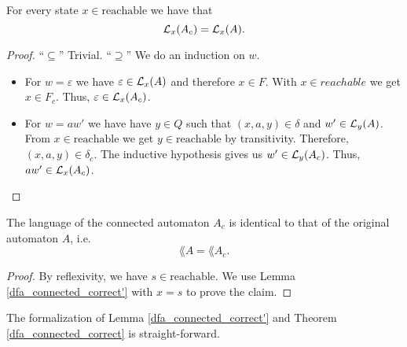 \begin{lemma}
    \label{dfa_connected_correct'}
    For every state $x \in \mathrm{reachable}$ we have that
    \begin{equation*}
        \mathcal{L}_{x}(A_c) = \mathcal{L}_{x}(A).
    \end{equation*}
\end{lemma}
\begin{proof}
    ``$\subseteq$'' Trivial.
    ``$\supseteq$''
    We do an induction on $w$.
    \begin{itemize}
        \item
            For $w = \varepsilon$ we have $\varepsilon \in \mathcal{L}_{x}(A)$ and therefore $x \in F$. 
            With $x \in reachable$ we get $x \in F_c$. 
            Thus, $\varepsilon \in \mathcal{L}_{x}(A_c)$.
        \item
            For $w = a w'$ we have have $y \in Q$ such that $(x, a, y) \in \delta$ and $w' \in \mathcal{L}_{y}(A)$.
            From $x \in \mathrm{reachable}$ we get $y \in \mathrm{reachable}$ by transitivity.
            Therefore, $(x,a,y) \in \delta_c$.
            The inductive hypothesis gives us $w' \in \mathcal{L}_{y}(A_c)$. 
            Thus, $a w' \in \mathcal{L}_{x}(A_c)$.
    \end{itemize}
\end{proof}

\begin{theorem}
    \label{dfa_connected_correct}
    The language of the connected automaton $A_c$ is identical to that of the original automaton $A$, i.e.
    \begin{equation*}
        \lang{A} = \lang{A_c}.        
    \end{equation*}
\end{theorem}

\begin{proof}
    By reflexivity, we have $s \in \mathrm{reachable}$. 
    We use Lemma \ref{dfa_connected_correct'} with $x = s$ to prove the claim.
\end{proof}


The formalization of Lemma \ref{dfa_connected_correct'} and Theorem \ref{dfa_connected_correct} is straight-forward.



